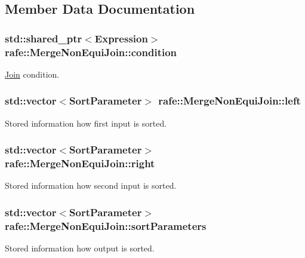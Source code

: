 \subsection{Member Data Documentation}
\hypertarget{classrafe_1_1_merge_non_equi_join_a9082928b98835f698363bba69a77ffbe}{
\subsubsection[{condition}]{\setlength{\rightskip}{0pt plus 5cm}std\+::shared\+\_\+ptr$<${\bf Expression}$>$ rafe\+::\+Merge\+Non\+Equi\+Join\+::condition}}\label{classrafe_1_1_merge_non_equi_join_a9082928b98835f698363bba69a77ffbe}
\hyperlink{classrafe_1_1_join}{Join} condition. \hypertarget{classrafe_1_1_merge_non_equi_join_acbef8c68400bc4f58acdad98e3457545}{
\subsubsection[{left}]{\setlength{\rightskip}{0pt plus 5cm}std\+::vector$<${\bf Sort\+Parameter}$>$ rafe\+::\+Merge\+Non\+Equi\+Join\+::left}}\label{classrafe_1_1_merge_non_equi_join_acbef8c68400bc4f58acdad98e3457545}
Stored information how first input is sorted. \hypertarget{classrafe_1_1_merge_non_equi_join_a7083c038cc58409fc535d46f82633d6a}{
\subsubsection[{right}]{\setlength{\rightskip}{0pt plus 5cm}std\+::vector$<${\bf Sort\+Parameter}$>$ rafe\+::\+Merge\+Non\+Equi\+Join\+::right}}\label{classrafe_1_1_merge_non_equi_join_a7083c038cc58409fc535d46f82633d6a}
Stored information how second input is sorted. \hypertarget{classrafe_1_1_merge_non_equi_join_af33e57260541cc8d7bda1905e2145983}{
\subsubsection[{sort\+Parameters}]{\setlength{\rightskip}{0pt plus 5cm}std\+::vector$<${\bf Sort\+Parameter}$>$ rafe\+::\+Merge\+Non\+Equi\+Join\+::sort\+Parameters}}\label{classrafe_1_1_merge_non_equi_join_af33e57260541cc8d7bda1905e2145983}
Stored information how output is sorted. 

